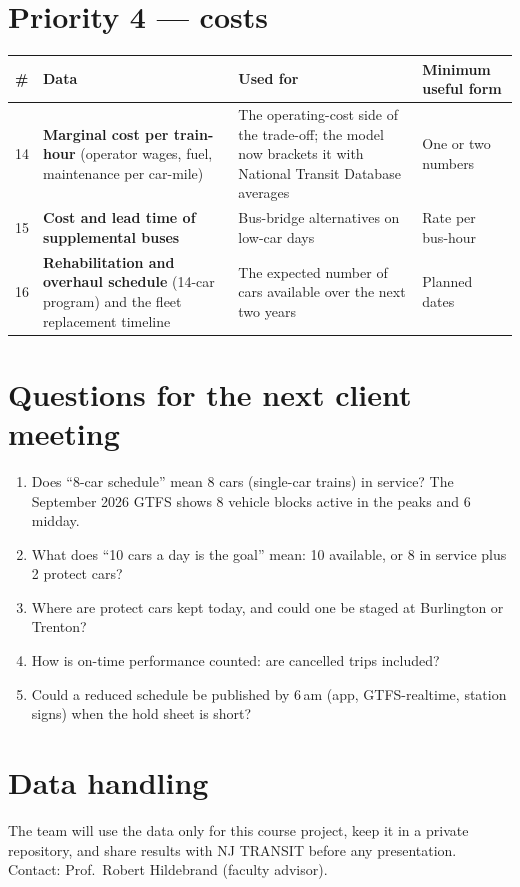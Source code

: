 \documentclass[11pt]{article}
\begin{document}
\section*{Priority 4 --- costs}
\begin{longtable}{@{}p{0.5cm}p{5.3cm}p{5.2cm}p{3.6cm}@{}}
\toprule
\# & Data & Used for & Minimum useful form \\
\midrule\endhead
14 & \textbf{Marginal cost per train-hour} (operator wages, fuel, maintenance per car-mile) & The operating-cost side of the trade-off; the model now brackets it with National Transit Database averages & One or two numbers \\
15 & \textbf{Cost and lead time of supplemental buses} & Bus-bridge alternatives on low-car days & Rate per bus-hour \\
16 & \textbf{Rehabilitation and overhaul schedule} (14-car program) and the fleet replacement timeline & The expected number of cars available over the next two years & Planned dates \\
\bottomrule
\end{longtable}

\section*{Questions for the next client meeting}
\begin{enumerate}
\item Does ``8-car schedule'' mean 8 cars (single-car trains) in service? The September 2026 GTFS shows 8 vehicle blocks active in the peaks and 6 midday.
\item What does ``10 cars a day is the goal'' mean: 10 available, or 8 in service plus 2 protect cars?
\item Where are protect cars kept today, and could one be staged at Burlington or Trenton?
\item How is on-time performance counted: are cancelled trips included?
\item Could a reduced schedule be published by 6\,am (app, GTFS-realtime, station signs) when the hold sheet is short?
\end{enumerate}

\section*{Data handling}
The team will use the data only for this course project, keep it in a private repository, and share results with NJ TRANSIT before any presentation. Contact: Prof.~Robert Hildebrand (faculty advisor).
\end{document}
